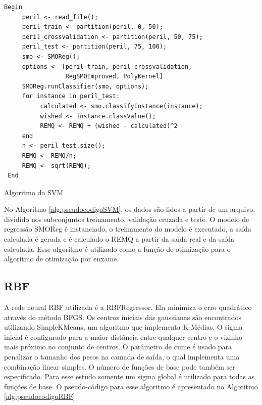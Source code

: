 \begin{algorithm}[H]
\label{alg:pseudocodigoSVM}
\begin{verbatim}
Begin
     peril <- read_file();
     peril_train <- partition(peril, 0, 50);
     peril_crossvalidation <- partition(peril, 50, 75);
     peril_test <- partition(peril, 75, 100);
     smo <- SMOReg();
     options <- [peril_train, peril_crossvalidation, 
                 RegSMOImproved, PolyKernel]
     SMOReg.runClassifier(smo, options);
     for instance in peril_test:
          calculated <- smo.classifyInstance(instance);
          wished <- instance.classValue();
          REMQ <- REMQ + (wished - calculated)^2
     end
     n <- peril_test.size();
     REMQ <- REMQ/n;
     REMQ <- sqrt(REMQ);
 End
\end{verbatim}     
\caption{Algoritmo do SVM}
\end{algorithm}
\bigskip

No Algoritmo \ref{alg:pseudocodigoSVM}, os dados são lidos a partir de um arquivo, dividido nos subconjuntos treinamento, validação cruzada e teste. O modelo de regressão SMOReg é instanciado, o treinamento do modelo é executado, a saída calculada é gerada e é calculado o REMQ a partir da saída real e da saída calculada. Esse algoritmo é utilizado como a função de otimização para o algoritmo de otimização por enxame.

\subsection{RBF}

A rede neural RBF utilizada é a RBFRegressor. Ela minimiza o erro quadrático através do método BFGS. Os centros iniciais das gaussianas são encontrados utilizando SimpleKMeans, um algoritmo que implementa K-Médias. O sigma inicial é configurado para a maior distância entre qualquer centro e o vizinho mais próximo no conjunto de centros. O parâmetro de cume é usado para penalizar o tamanho dos pesos na camada de saída, o qual implementa uma combinação linear simples. O número de funções de base pode também ser especificado. Para esse estudo somente um sigma global é utilizado para todas as funções de base. O pseudo-código para esse algoritmo é apresentado no Algoritmo \ref{alg:pseudocodigoRBF}.

